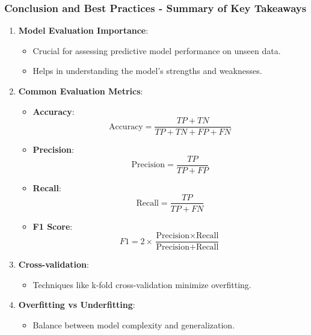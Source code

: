 \documentclass{beamer}
\begin{document}
\begin{frame}[fragile]
    \frametitle{Conclusion and Best Practices - Summary of Key Takeaways}
    
    \begin{enumerate}
        \item \textbf{Model Evaluation Importance}:
        \begin{itemize}
            \item Crucial for assessing predictive model performance on unseen data.
            \item Helps in understanding the model's strengths and weaknesses.
        \end{itemize}
        
        \item \textbf{Common Evaluation Metrics}:
        \begin{itemize}
            \item \textbf{Accuracy}: 
            \[
            \text{Accuracy} = \frac{TP + TN}{TP + TN + FP + FN}
            \]
            \item \textbf{Precision}: 
            \[
            \text{Precision} = \frac{TP}{TP + FP}
            \]
            \item \textbf{Recall}: 
            \[
            \text{Recall} = \frac{TP}{TP + FN}
            \]
            \item \textbf{F1 Score}: 
            \[
            F1 = 2 \times \frac{\text{Precision} \times \text{Recall}}{\text{Precision} + \text{Recall}}
            \]
        \end{itemize}
        
        \item \textbf{Cross-validation}:
        \begin{itemize}
            \item Techniques like k-fold cross-validation minimize overfitting.
        \end{itemize}
        
        \item \textbf{Overfitting vs Underfitting}:
        \begin{itemize}
            \item Balance between model complexity and generalization.
        \end{itemize}
    \end{enumerate}
\end{frame}
\end{document}
